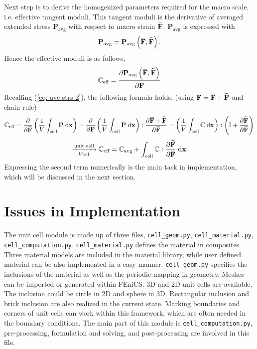 \documentclass[10pt,a4paper]{scrreprt}
\newcommand{\myd}{\;\mathrm{d}}
\newcommand{\overbar}[1]{\mkern 1.5mu\overline{\mkern-1.5mu#1\mkern-1.5mu}\mkern 1.5mu}
\begin{document}
Next step is to derive the homogenized parameters required for the macro scale, i.e. effective tangent moduli. This tangent moduli is the derivative of averaged extended stress $\mathbf{P}_{\text{avg}}$ with respect to macro strain $\overbar{\mathbf{F}}$. $\mathbf{P}_{\text{avg}}$ is expressed with 
\begin{equation}
\mathbf{P}_{\text{avg}} = \mathbf{P}_{\text{avg}} \left( \overbar{\mathbf{F}}, \widetilde{\mathbf{F}} \right).
\end{equation}
Hence the effective moduli is as follows,
\begin{equation}
\mathbb{C}_{\text{eff}} = \dfrac{\partial \mathbf{P}_{\text{avg}} \left( \overbar{\mathbf{F}}, \widetilde{\mathbf{F}} \right)}{\partial \overbar{\mathbf{F}}}
\end{equation}
Recalling (\ref{eq: ave strs 2}), the following formula holds, (using $\mathbf{F} = \overbar{\mathbf{F}} + \widetilde{\mathbf{F}}$ and chain rule)
\[
\mathbb{C}_{\text{eff}} = \dfrac{\partial}{\partial \overbar{\mathbf{F}}} \left( \dfrac{1}{V} \int_{\text{cell}} \mathbf{P} \myd{\mathbf{x}} \right) = \dfrac{\partial}{\partial \mathbf{F}} \left( \dfrac{1}{V} \int_{\text{cell}} \mathbf{P} \myd{\mathbf{x}} \right) : \dfrac{\partial \overbar{\mathbf{F}} + \widetilde{\mathbf{F}}}{\partial \overbar{\mathbf{F}}} =  \left( \dfrac{1}{V} \int_{\text{cell}}  \mathbb{C} \myd{\mathbf{x}} \right) : \left( \mathbb{I} + \dfrac{\partial \widetilde{\mathbf{F}}}{\partial \overbar{\mathbf{F}}} \right)
\]
\begin{equation}
\label{eq: c eff}
\xrightarrow[ V = 1]{\text{unit cell}} \mathbb{C}_{\text{eff}} = \mathbb{C}_{\text{avg}} + \int_{\text{cell}}  \mathbb{C} : \dfrac{\partial \widetilde{\mathbf{F}}}{\partial \overbar{\mathbf{F}}} \myd{\mathbf{x}} 
\end{equation}
Expressing the second term numerically is the main task in implementation, which will be discussed in the next section.

\section{Issues in Implementation}
The unit cell module is made up of three files, \texttt{cell\_geom.py}, \texttt{cell\_material.py}, \texttt{cell\_computation.py}. \texttt{cell\_material.py} defines the material in composites. Three material models are included in the material library, while user defined material can be also implemented in a easy manner. \texttt{cell\_geom.py} specifies the inclusions of the material as well as the periodic mapping in geometry. Meshes can be imported or generated within FEniCS. 3D and 2D unit cells are available. The inclusion could be circle in 2D and sphere in 3D. Rectangular inclusion and brick inclusion are also realized in the current state. Marking boundaries and corners of unit cells can work within this framework, which are often needed in the boundary conditions. The main part of this module is \texttt{cell\_computation.py}, pre-processing, formulation and solving, and post-processing are involved in this file. 
\end{document}
